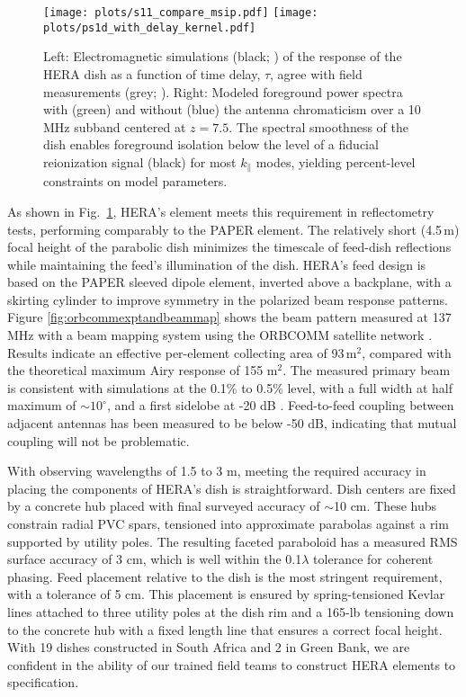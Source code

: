 \documentclass[preprint,11pt]{aastex}
\newcommand{\Mycitep}[1]{\citep{#1}}
\begin{document}
\begin{figure}[tb]
	\centering
    \texttt{[image: plots/s11\_compare\_msip.pdf]}
\texttt{[image: plots/ps1d\_with\_delay\_kernel.pdf]}
	\vspace{-25pt}
	\caption{Left: Electromagnetic simulations (black; \citealt{ewallwice_et_al2016}) of the response of the HERA dish as a function of time delay, $\tau$,
       agree with field measurements (grey; \citealt{patra_et_al2016}). 
Right: Modeled foreground power spectra with (green) and without (blue) the antenna chromaticism over a 10\,MHz subband centered at $z=7.5$. The spectral smoothness of the dish enables foreground isolation below the level of a fiducial reionization signal (black) for most $k_{\parallel}$ modes, yielding percent-level constraints on model parameters.}
	\label{fig:reflectometry}
	\vspace{-10pt}
\end{figure}

As shown in Fig.~\ref{fig:reflectometry}, HERA's element meets this requirement in
reflectometry tests, performing comparably to the PAPER element.  The
relatively short (4.5\,m) focal height of the parabolic dish 
minimizes the timescale of feed-dish reflections while maintaining the feed's
illumination of the dish.  HERA's feed design is based on the PAPER sleeved
dipole element, inverted above a backplane, with a skirting cylinder to
improve symmetry in the polarized beam response patterns.  Figure
\ref{fig:orbcommexptandbeammap} shows the beam pattern measured at 137 MHz with a beam mapping
system using the ORBCOMM satellite network \Mycitep{neben_et_al2016}.  Results
indicate an effective per-element collecting area of 93\,m$^2$, compared with the
theoretical maximum Airy response of 155 m$^2$.  The measured primary beam is
consistent with simulations at the 0.1\% to 0.5\% level, with a full width at
half maximum of $\sim$$10^\circ$, and a first sidelobe at -20 dB \citep{ewallwice_et_al2016,neben_et_al2016,patra_et_al2016,thyagarajan_et_al2016}.
Feed-to-feed coupling between adjacent antennas has been measured to be below -50 dB, indicating
that mutual coupling will not be problematic.

With observing wavelengths of 1.5 to 3 m, meeting the required accuracy
in placing the components of HERA's dish is straightforward.
Dish centers are fixed
by a concrete hub placed with final surveyed accuracy of $\sim$10 cm.  These
hubs constrain radial PVC spars, tensioned into approximate parabolas against a
rim supported by utility poles.  The resulting faceted paraboloid has
a measured RMS surface accuracy of 3 cm, which is well within the 0.1$\lambda$ tolerance for
coherent phasing.  Feed placement relative to the dish is the most stringent requirement, with
a tolerance of 5 cm.  This placement is ensured by spring-tensioned Kevlar lines attached to
three utility poles at the dish rim and a 165-lb tensioning down to the concrete hub with
a fixed length line that ensures a correct focal height.  With 19 dishes constructed in South Africa
and 2 in Green Bank, we are confident in the ability of our trained field teams to construct HERA
elements to specification.
\end{document}
